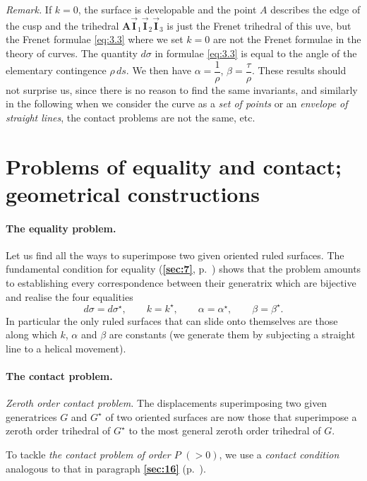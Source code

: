 \documentclass[leqno,11pt]{book}
\numberwithin{equation}{chapter}
\theoremstyle{shape1}
\theoremstyle{shapesmall}
\newcommand{\fsref}[1]{{\rm\textsection\textbf{\ref{sec:#1}}}}
\newcommand{\str}{^{\star}}
\newcommand{\rvec}[1]{\vec{\mathbf{#1}}}
\newcommand{\ivec}{\rvec{I}}
\newcommand{\somespace}{\vspace{9pt}}
\begin{document}
\somespace

\emph{Remark.} If $k=0$, the surface is developable and the point $A$ describes the edge of the cusp and the trihedral $\mathbf{A}\ivec_{1}\ivec_{2}\ivec_{3}$ is just the Frenet trihedral of this uve, but the Frenet formulae \eqref{eq:3.3} where we set $k=0$ are not the Frenet formulae in the theory of curves. The quantity $d\sigma$ in formulae \eqref{eq:3.3} is equal to the angle of the elementary contingence $\rho\,ds$. We then have $\alpha=\dfrac{1}{\rho}$, $\beta=\dfrac{\tau}{\rho}$. These results should not surprise us, since there is no reason to find the same invariants, and similarly in the following when we consider the curve as a \emph{set of points} or an \emph{envelope of straight lines}, the contact problems are not the same, etc.

\section[{Problems of equality and contact; geometrical constructions}]{Problems of equality and contact;\\geometrical constructions}
\label{sec:probl-equal-cont-1}

\paragraph{The equality problem.}
\label{sec:46}
Let us find all the ways to superimpose two given oriented ruled surfaces. The fundamental condition for equality (\fsref{7}, p.~\pageref{sec:7}) shows that the problem amounts to establishing every correspondence between their generatrix which are bijective and realise the four equalities
\[
d\sigma=d\sigma\str,\qquad k=k\str,\qquad \alpha=\alpha\str,\qquad\beta=\beta\str.
\]
In particular the only ruled surfaces that can slide onto themselves are those along which $k$, $\alpha$ and $\beta$ are constants (we generate them by subjecting a straight line to a helical movement).

\paragraph{The contact problem.}
\label{sec:47}
\emph{Zeroth order contact problem.} The displacements superimposing two given generatrices $G$ and $G\str$ of two oriented surfaces are now those that superimpose a zeroth order trihedral of $G\str$ to the most general zeroth order trihedral of $G$.

To tackle \emph{the contact problem of order $P$} $(>0)$, we use a \emph{contact condition} analogous to that in paragraph \fsref{16} (p.~\pageref{sec:16}).
\end{document}
